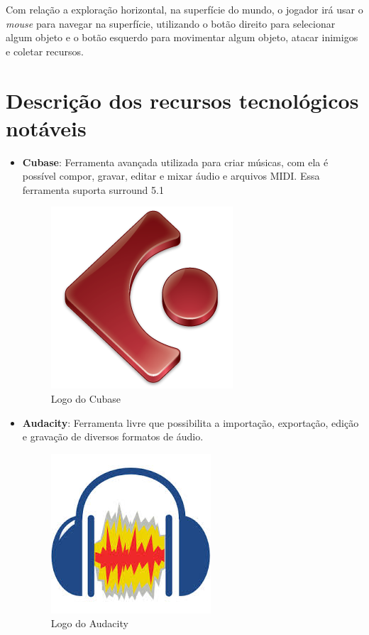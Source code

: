 \documentclass[11pt]{article} %
\begin{document}
Com relação a exploração horizontal, na superfície do mundo, o jogador irá usar o \textit{mouse} para navegar na superfície, utilizando o botão direito para selecionar algum objeto e o botão esquerdo para movimentar algum objeto, atacar inimigos e coletar recursos. 
\section*{Descrição dos recursos tecnológicos notáveis}

\begin{itemize}
\item \textbf{Cubase}: Ferramenta avançada utilizada para criar músicas, com ela é possível compor, gravar, editar e mixar áudio e arquivos MIDI. Essa ferramenta suporta surround 5.1

\begin{figure}[!htp]
\centering
\includegraphics[scale=0.3]{res/cubase-Logo.png}
\caption{Logo do Cubase}
\label{Cubase}
\end{figure}

\item \textbf{Audacity}: Ferramenta livre que possibilita a importação, exportação, edição e gravação de diversos formatos de áudio.

\begin{figure}[!htp]
\centering
\includegraphics[scale=0.3]{res/audacity.jpg}
\caption{Logo do Audacity}
\label{Audacity}
\end{figure}


\end{itemize}
\end{document}
